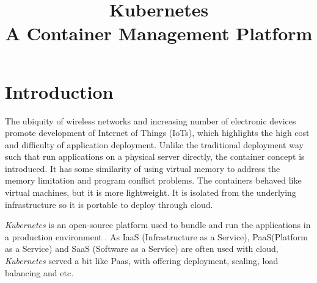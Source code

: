 \documentclass[conference, a4paper]{IEEEtran_ID}
\begin{document}
\title{Kubernetes \\ 
\LARGE{A Container Management Platform} %
}

\maketitle
\thispagestyle{fancy}

\section{Introduction}

The ubiquity of wireless networks and increasing number of electronic devices promote development of Internet of Things (IoTs), which highlights the high cost and difficulty of application deployment. Unlike the traditional deployment way such that run applications on a physical server directly, the container concept is introduced. It has some similarity of using virtual memory to address the memory limitation and program conflict problems. The containers behaved like virtual machines, but it is more lightweight. It is isolated from the underlying infrastructure so it is portable to deploy through cloud. 

\textit{Kubernetes} is an open-source platform used to bundle and run the applications in a production environment \cite{kudoc}. As IaaS (Infrastructure as a Service), PaaS(Platform as a Service) and SaaS (Software as a Service) are often used with cloud, \textit{Kubernetes} served a bit like Paas, with offering deployment, scaling, load balancing and etc\cite{ar1}.
\end{document}

